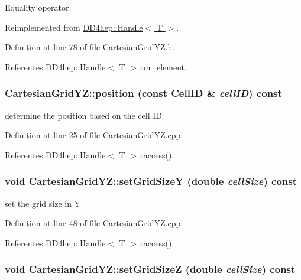 Equality operator. 

Reimplemented from \hyperlink{class_d_d4hep_1_1_handle_a618470283b3a2cc5ed0545fec90dc759}{DD4hep::Handle$<$ T $>$}.

Definition at line 78 of file CartesianGridYZ.h.

References DD4hep::Handle$<$ T $>$::m\_\-element.\hypertarget{class_d_d4hep_1_1_geometry_1_1_cartesian_grid_y_z_ab29bceeb4c0988d679a615f1d7c4fb6c}{
\subsubsection[{position}]{ CartesianGridYZ::position (const CellID \& {\em cellID}) const}}
\label{class_d_d4hep_1_1_geometry_1_1_cartesian_grid_y_z_ab29bceeb4c0988d679a615f1d7c4fb6c}


determine the position based on the cell ID 

Definition at line 25 of file CartesianGridYZ.cpp.

References DD4hep::Handle$<$ T $>$::access().\hypertarget{class_d_d4hep_1_1_geometry_1_1_cartesian_grid_y_z_a72e8d223d58503b05885bf1c8ca6f13b}{
\subsubsection[{setGridSizeY}]{\setlength{\rightskip}{0pt plus 5cm}void CartesianGridYZ::setGridSizeY (double {\em cellSize}) const}}
\label{class_d_d4hep_1_1_geometry_1_1_cartesian_grid_y_z_a72e8d223d58503b05885bf1c8ca6f13b}


set the grid size in Y 

Definition at line 48 of file CartesianGridYZ.cpp.

References DD4hep::Handle$<$ T $>$::access().\hypertarget{class_d_d4hep_1_1_geometry_1_1_cartesian_grid_y_z_a1812722ba2ebf57c0e08f40fa1740dae}{
\subsubsection[{setGridSizeZ}]{\setlength{\rightskip}{0pt plus 5cm}void CartesianGridYZ::setGridSizeZ (double {\em cellSize}) const}}
\label{class_d_d4hep_1_1_geometry_1_1_cartesian_grid_y_z_a1812722ba2ebf57c0e08f40fa1740dae}


